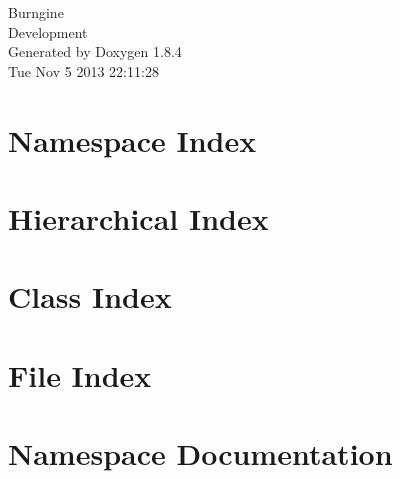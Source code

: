 \documentclass[twoside]{book}
\newcommand{\clearemptydoublepage}{%
  \newpage{\pagestyle{empty}\cleardoublepage}%
}
\begin{document}
\hypersetup{pageanchor=false}
\begin{titlepage}
\vspace*{7cm}
\begin{center}%
{\Large Burngine \\[1ex]\large Development }\\
\vspace*{1cm}
{\large Generated by Doxygen 1.8.4}\\
\vspace*{0.5cm}
{\small Tue Nov 5 2013 22:11:28}\\
\end{center}
\end{titlepage}
\clearemptydoublepage
\tableofcontents
\clearemptydoublepage
{}
\hypersetup{pageanchor=true}

\chapter{Namespace Index}

\chapter{Hierarchical Index}

\chapter{Class Index}

\chapter{File Index}

\chapter{Namespace Documentation}

\end{document}
